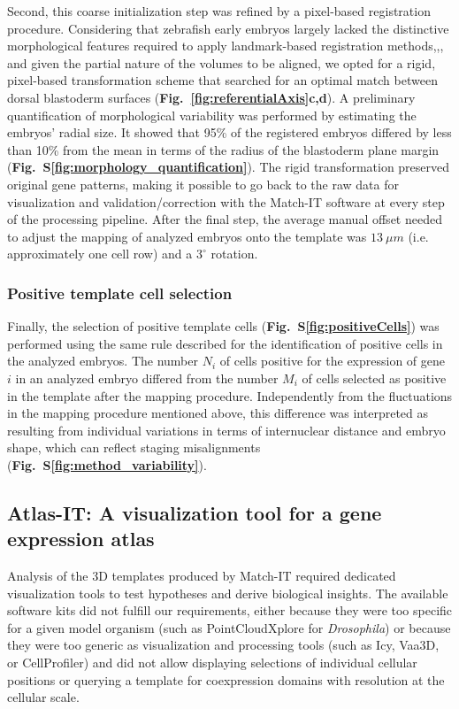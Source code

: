 Second, this coarse initialization step was refined by a pixel-based registration procedure. Considering that zebrafish early embryos largely lacked the distinctive morphological features required to apply landmark-based registration methods\cite{tomer2010profiling},\cite{peng2011brainaligner},\cite{egger20123d}, and given the partial nature of the volumes to be aligned, we opted for a rigid, pixel-based transformation scheme\cite{castro2009automatic} that searched for an optimal match between dorsal blastoderm surfaces (\textbf{Fig.~\ref{fig:referentialAxis}c,d}). A preliminary quantification of morphological variability was performed by estimating the embryos' radial size. It showed that 95\% of the registered embryos differed by less than 10\% from the mean in terms of the radius of the blastoderm plane margin (\textbf{Fig.~S\ref{fig:morphology_quantification}}). The rigid transformation preserved original gene patterns, making it possible to go back to the raw data for visualization and validation/correction with the Match-IT software at every step of the processing pipeline. After the final step, the average manual offset needed to adjust the mapping of analyzed embryos onto the template was $13~\mu m$ (i.e. approximately one cell row) and a $3^\circ$ rotation.

\subsubsection*{Positive template cell selection}

Finally, the selection of positive template cells (\textbf{Fig.~S\ref{fig:positiveCells}}) was performed using the same rule described for the identification of positive cells in the analyzed embryos. The number $N_i$ of cells positive for the expression of gene $i$ in an analyzed embryo differed from the number $M_i$ of cells selected as positive in the template after the mapping procedure. Independently from the fluctuations in the mapping procedure mentioned above, this difference was interpreted as resulting from individual variations in terms of internuclear distance and embryo shape, which can reflect staging misalignments (\textbf{Fig.~S\ref{fig:method_variability}}).

\subsection*{Atlas-IT: A visualization tool for a gene expression atlas}

Analysis of the 3D templates produced by Match-IT required dedicated visualization tools to test hypotheses and derive biological insights. The available software kits did not fulfill our requirements, either because they were too specific for a given model organism (such as PointCloudXplore\cite{rubel2010integrating} for \emph{Drosophila}) or because they were too generic as visualization and processing tools (such as Icy\cite{de2012icy}, Vaa3D\cite{peng2010v3d}, or CellProfiler\cite{jones2008cellprofiler}) and did not allow displaying selections of individual cellular positions or querying a template for coexpression domains with resolution at the cellular scale.

